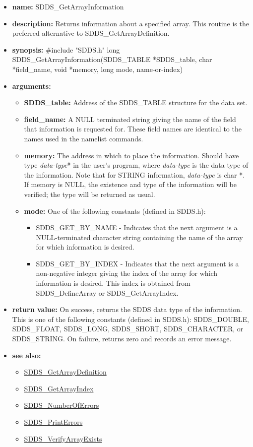 \documentclass[11pt]{article}
\newcommand{\progref}[1]{\hyperref{SDDS_#1}{{\tt SDDS\_#1} (}{)}{SDDS_#1}}
\begin{document}
\begin{itemize}
\item {\bf name:}\newline
SDDS\_GetArrayInformation
\item {\bf description:}\newline
Returns information about a specified array. This routine is the preferred alternative to SDDS\_GetArrayDefinition.
\item {\bf synopsis:} \#include "SDDS.h"\newline
long SDDS\_GetArrayInformation(SDDS\_TABLE *SDDS\_table, char *field\_name, void *memory, long mode,  name-or-index)
\item {\bf arguments:}
\begin{itemize}
\item {\bf SDDS\_table:} Address of the SDDS\_TABLE structure for the data set.
\item {\bf field\_name:} A NULL terminated string giving the name of the field that information is requested for. These field names are identical to the names used in the namelist commands.
\item {\bf memory:} The address in which to place the information. Should have type {\em data-type}* in the user's program, where {\em data-type} is the data type of the information. Note that for STRING information, {\em data-type} is char *. If memory is NULL, the existence and type of the information will be verified; the type will be returned as usual.
\item {\bf mode:} One of the following constants (defined in SDDS.h):
\begin{itemize}
\item SDDS\_GET\_BY\_NAME -  Indicates that the next argument is a NULL-terminated character string containing the name of the array for which information is desired.
\item SDDS\_GET\_BY\_INDEX - Indicates that the next argument is a non-negative integer giving the index of the array for which information is desired. This index is obtained from SDDS\_DefineArray or SDDS\_GetArrayIndex.
\end{itemize}
\end{itemize}
\item {\bf return value:}\newline
On success, returns the SDDS data type of the information. This is one of the following constants (defined in SDDS.h): SDDS\_DOUBLE, SDDS\_FLOAT, SDDS\_LONG, SDDS\_SHORT, SDDS\_CHARACTER, or SDDS\_STRING.\newline
\newline
On failure, returns zero and records an error message. 
\item {\bf see also:}
\begin{itemize}
\item \progref{GetArrayDefinition}
\item \progref{GetArrayIndex}
\item \progref{NumberOfErrors}
\item \progref{PrintErrors}
\item \progref{VerifyArrayExists}
\end{itemize}
\end{itemize}
\end{document}
